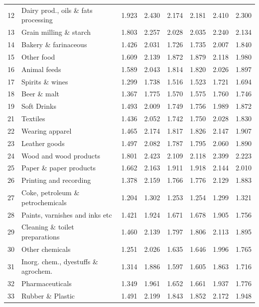 \begin{longtable}{@{\extracolsep{\fill}}rlrrrrrr@{}}
    12    & Dairy prod., oils \& fats processing & 1.923 & 2.430 & 2.174 & 2.181 & 2.410 & 2.300 \\
    13    & Grain milling \& starch & 1.803 & 2.257 & 2.028 & 2.035 & 2.240 & 2.134 \\
    14    & Bakery \& farinaceous & 1.426 & 2.031 & 1.726 & 1.735 & 2.007 & 1.840 \\
    15    & Other food & 1.609 & 2.139 & 1.872 & 1.879 & 2.118 & 1.980 \\
    16    & Animal feeds & 1.589 & 2.043 & 1.814 & 1.820 & 2.026 & 1.897 \\
    17    & Spirits \& wines & 1.299 & 1.738 & 1.516 & 1.523 & 1.721 & 1.694 \\
    18    & Beer \& malt & 1.367 & 1.775 & 1.570 & 1.575 & 1.760 & 1.746 \\
    19    & Soft Drinks & 1.493 & 2.009 & 1.749 & 1.756 & 1.989 & 1.872 \\
    21    & Textiles & 1.436 & 2.052 & 1.742 & 1.750 & 2.028 & 1.830 \\
    22    & Wearing apparel & 1.465 & 2.174 & 1.817 & 1.826 & 2.147 & 1.907 \\
    23    & Leather goods & 1.497 & 2.082 & 1.787 & 1.795 & 2.060 & 1.890 \\
    24    & Wood and wood products & 1.801 & 2.423 & 2.109 & 2.118 & 2.399 & 2.223 \\
    25    & Paper \& paper products & 1.662 & 2.163 & 1.911 & 1.918 & 2.144 & 2.010 \\
    26    & Printing and recording & 1.378 & 2.159 & 1.766 & 1.776 & 2.129 & 1.883 \\
    27    & Coke, petroleum \& petrochemicals & 1.204 & 1.302 & 1.253 & 1.254 & 1.299 & 1.321 \\
    28    & Paints, varnishes and inks etc & 1.421 & 1.924 & 1.671 & 1.678 & 1.905 & 1.756 \\
    29    & Cleaning \& toilet preparations & 1.460 & 2.139 & 1.797 & 1.806 & 2.113 & 1.895 \\
    30    & Other chemicals & 1.251 & 2.026 & 1.635 & 1.646 & 1.996 & 1.765 \\
    31    & Inorg. chem., dyestuffs \& agrochem. & 1.314 & 1.886 & 1.597 & 1.605 & 1.863 & 1.716 \\
    32    & Pharmaceuticals & 1.349 & 1.961 & 1.652 & 1.661 & 1.937 & 1.776 \\
    33    & Rubber \& Plastic & 1.491 & 2.199 & 1.843 & 1.852 & 2.172 & 1.948 \\

\end{longtable}
